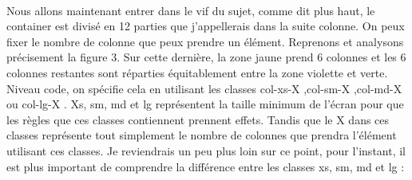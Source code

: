 \documentclass{article}
\begin{document}
\vspace{0.5cm}\\
Nous allons maintenant entrer dans le vif du sujet, comme dit plus haut, le container est divis\'e en 12 parties que j'appellerais dans la suite colonne. On peux fixer le nombre de colonne que peux prendre un \'el\'ement. Reprenons et analysons pr\'ecisement la figure 3. Sur cette derni\`ere, la zone jaune prend 6 colonnes et les 6 colonnes restantes sont r\'eparties \'equitablement entre la zone violette et verte. Niveau code, on sp\'ecifie cela en utilisant les classes \og col-xs-X \fg,\og col-sm-X \fg,\og col-md-X \fg ou \og col-lg-X \fg. Xs, sm, md et lg repr\'esentent la taille minimum de l'\'ecran pour que les r\`egles que ces classes contiennent prennent effets. Tandis que le X dans ces classes repr\'esente tout simplement le nombre de colonnes que prendra l'\'el\'ement utilisant ces classes. Je reviendrais un peu plus loin sur ce point, pour l'instant, il est plus important de comprendre la diff\'erence entre les classes xs, sm, md et lg :
\vspace{0.5cm}\\
\end{document}
